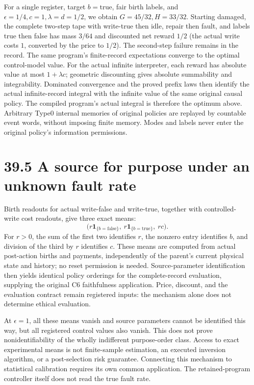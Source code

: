 \documentclass[
  english,
  11pt,
  oneside]{book}
\begin{document}
For a single register, target \(b=\mathrm{true}\), fair birth labels, and \(\epsilon=1/4,c=1,\lambda=d=1/2\), we obtain \(G=45/32,H=33/32\). Starting damaged, the complete two-step tape with write-true then idle, repair then fault, and labels true then false has mass \(3/64\) and discounted net reward \(1/2\) (the actual write costs \(1\), converted by the price to \(1/2\)). The second-step failure remains in the record. The same program's finite-record expectations converge to the optimal control-model value. For the actual infinite interpreter, each reward has absolute value at most \(1+\lambda c\); geometric discounting gives absolute summability and integrability. Dominated convergence and the proved prefix laws then identify the actual infinite-record integral with the infinite value of the same original causal policy. The compiled program's actual integral is therefore the optimum above. Arbitrary Type0 internal memories of original policies are replayed by countable event words, without imposing finite memory. Modes and labels never enter the original policy's information permissions.

\section{39.5 A source for purpose under an unknown fault rate}\label{a-source-for-purpose-under-an-unknown-fault-rate}

Birth readouts for actual write-false and write-true, together with controlled-write cost readouts, give three exact means: \[\bigl(r\mathbf1_{\{b=\mathrm{false}\}},\ r\mathbf1_{\{b=\mathrm{true}\}},\ rc\bigr).\] For \(r>0\), the sum of the first two identifies \(r\), the nonzero entry identifies \(b\), and division of the third by \(r\) identifies \(c\). These means are computed from actual post-action births and payments, independently of the parent's current physical state and history; no reset permission is needed. Source-parameter identification then yields identical policy orderings for the complete-record evaluation, supplying the original C6 faithfulness application. Price, discount, and the evaluation contract remain registered inputs: the mechanism alone does not determine ethical evaluation.

At \(\epsilon=1\), all these means vanish and source parameters cannot be identified this way, but all registered control values also vanish. This does not prove nonidentifiability of the wholly indifferent purpose-order class. Access to exact experimental means is not finite-sample estimation, an executed inversion algorithm, or a post-selection risk guarantee. Connecting this mechanism to statistical calibration requires its own common application. The retained-program controller itself does not read the true fault rate.
\end{document}
